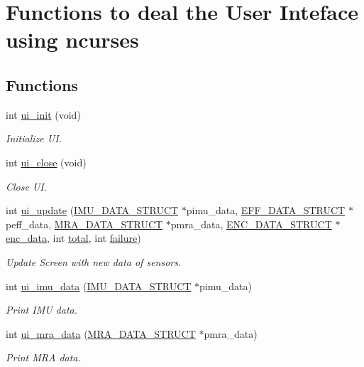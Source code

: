 \hypertarget{group__ui}{
\section{Functions to deal the User Inteface using ncurses}
\label{group__ui}
}
\subsection*{Functions}
\begin{DoxyCompactItemize}
\item 
int \hyperlink{group__ui_gab7bfb453918dcc296ff0cea3c79453d0}{ui\_\-init} (void)
\begin{DoxyCompactList}\small\item\em Initialize UI. \item\end{DoxyCompactList}\item 
int \hyperlink{group__ui_ga65d8b92b634da17c344458cd57e61f3e}{ui\_\-close} (void)
\begin{DoxyCompactList}\small\item\em Close UI. \item\end{DoxyCompactList}\item 
int \hyperlink{group__ui_ga42e4dac2d138061a74c572358c8ebf49}{ui\_\-update} (\hyperlink{structIMU__DATA__STRUCT}{IMU\_\-DATA\_\-STRUCT} $\ast$pimu\_\-data, \hyperlink{structEFF__DATA__STRUCT}{EFF\_\-DATA\_\-STRUCT} $\ast$peff\_\-data, \hyperlink{structMRA__DATA__STRUCT}{MRA\_\-DATA\_\-STRUCT} $\ast$pmra\_\-data, \hyperlink{structENC__DATA__STRUCT}{ENC\_\-DATA\_\-STRUCT} $\ast$\hyperlink{main2_8c_aaa441e18ae805c4f3efb0b5231d1cfe7}{enc\_\-data}, int \hyperlink{threads__linux_8c_ac7af894858cf396a219d632f40afdc8d}{total}, int \hyperlink{threads__linux_8c_a4f35e5ea2395561d0bd3b2f45612dc2c}{failure})
\begin{DoxyCompactList}\small\item\em Update Screen with new data of sensors. \item\end{DoxyCompactList}\item 
int \hyperlink{group__ui_ga7d5a9d9a75693709de408781d001a6a6}{ui\_\-imu\_\-data} (\hyperlink{structIMU__DATA__STRUCT}{IMU\_\-DATA\_\-STRUCT} $\ast$pimu\_\-data)
\begin{DoxyCompactList}\small\item\em Print IMU data. \item\end{DoxyCompactList}\item 
int \hyperlink{group__ui_gaefec243c5df45db0350c1abbccf20e3b}{ui\_\-mra\_\-data} (\hyperlink{structMRA__DATA__STRUCT}{MRA\_\-DATA\_\-STRUCT} $\ast$pmra\_\-data)
\begin{DoxyCompactList}\small\item\em Print MRA data. \item\end{DoxyCompactList}\end{DoxyCompactItemize}


